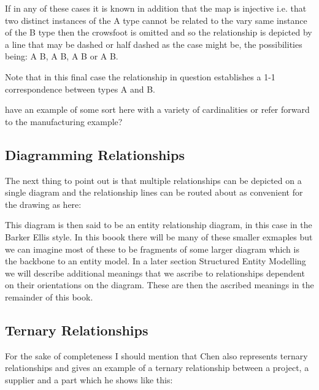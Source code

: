 If in any of these cases it is known in addition  that the map is injective i.e. that two distinct instances of the A type cannot be related to the vary same instance of the B type then the crowsfoot is omitted and so the relationship is depicted by a line that
may be dashed or half dashed as the case might be, the possibilities being:
A\,\barkerEllisE\,B, 
A\,\barkerEllisF\,B, 
A\,\barkerEllisG\,B or 
A\,\barkerEllisH\,B.

Note that in this final case the relationship in question establishes a 1-1 correspondence between types A and B.

\begin{noteforfuture}
have an example of some sort here with a variety of cardinalities or refer forward to the manufacturing example?
\end{noteforfuture}

\subsection*{Diagramming Relationships}
The next thing to point out is that multiple relationships can be depicted on a single diagram and the relationship lines can be routed about as convenient for the drawing as here:
\begin{center}

\end{center}

This diagram is then said to be an entity relationship diagram, in this case in the Barker Ellis style. In this boook there will be many of these smaller exmaples but we can imagine most of these to be fragments of some larger diagram which is the backbone to an entity model.
In a later section Structured Entity Modelling we will describe additional meanings that we ascribe to relationships dependent on their orientations on the diagram. These are then the ascribed meanings in the remainder of this book. 

\subsection*{Ternary Relationships}
For the sake of completeness I should mention that Chen also represents ternary relationships and gives an 
example of a ternary relationship between a project, a supplier and a part which he shows like this:


\begin{center}
\scalebox{0.9}{}
\end{center}

